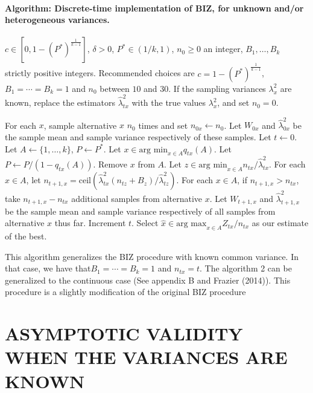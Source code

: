 \documentclass{wscpaperproc}
\newcommand{\lambdahat}{\widehat{\lambda}}
\newcommand{\xhat}{\hat{x}}
\newcommand{\upthresh}{P}
\newcommand{\cmax}{1-(P^*)^{\frac1{k-1}}}
\newcommand{\ceil}{\mathrm{ceil}}
\theoremstyle{wsc}
\begin{document}
\paragraph{Algorithm: Discrete-time implementation of BIZ, for unknown and/or heterogeneous variances.}
\vspace{0.1mm}    
\begin{algorithmic}[1]   
\label{alg:hetero-BIZ}   
\REQUIRE $c \in [0,\cmax]$, $\delta>0$, $P^*\in(1/k,1)$, $n_0\ge0$ an integer, $B_1,\ldots,B_k$ strictly positive integers.  Recommended choices are $c=\cmax$, $B_1=\cdots=B_k=1$ and $n_0$ between $10$ and $30$.     If the sampling variances $\lambda^2_x$ are known, replace the estimators     
$\lambdahat^2_{tx}$ with the true values $\lambda^2_x$, and set $n_0=0$.     

\STATE For each $x$, sample alternative $x$ $n_0$ times and set $n_{0x} \leftarrow n_0$.     
Let $W_{0x}$ and $\lambdahat^2_{0x}$ be the sample mean and sample variance respectively of these samples.     Let $t\leftarrow 0$.     
\STATE Let $A \leftarrow \{ 1,\ldots, k\}$, $\upthresh \leftarrow P^*$.
 \STATE Let $x\in\mbox{arg min}_{x\in A} q_{tx}\left(A\right)$.
    \STATE Let $\upthresh \leftarrow \upthresh/(1-q_{tx}\left(A\right))$.     
\STATE Remove $x$ from $A$.
\ENDWHILE
  \STATE Let $z \in \mbox{arg min}_{x\in A} n_{tx} / \lambdahat^2_{tx}$.     
\STATE For each $x\in A$, let      $n_{t+1,x} = \ceil\left( \lambdahat^2_{tx} (n_{tz} + B_z) / \lambdahat^2_{tz} \right)$.     \STATE For each $x\in A$, if $n_{t+1,x}>n_{tx}$, take $n_{t+1,x}-n_{tx}$ additional samples from alternative $x$.  Let $W_{t+1,x}$ and $\lambdahat^2_{t+1,x}$ be the sample mean and sample variance respectively of all samples from alternative $x$ thus far.    
\STATE Increment $t$.
 \ENDWHILE
  \STATE Select $\xhat \in\mbox{arg max}_{x\in A} Z_{tx} / n_{tx}$ as our estimate of the best.

   
\end{algorithmic} 

\vspace{1mm}
This algorithm generalizes the BIZ procedure with known common variance. In that case, we have that$B_1=\cdots=B_k=1$ and $n_{tx}=t$. The algorithm 2 can be generalized to the continuous case (See appendix B and Frazier (2014)). This procedure is a slightly modification of the original BIZ procedure 

\section{ASYMPTOTIC VALIDITY WHEN THE VARIANCES ARE KNOWN}
\end{document}
